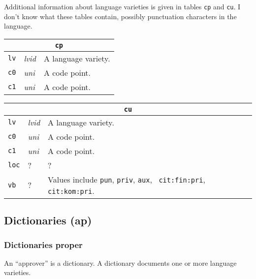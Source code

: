 Additional information about language varieties is given in tables
{\tt cp} and {\tt cu}.  I don't know what these tables contain,
possibly punctuation characters in the language.

\begin{trivlist}\item
\begin{tabular}{|llp{3.5in}|}
\hline
\multicolumn{3}{|c|}{\tt cp}\\
\hline
{\tt lv} & {\it lvid} & A language variety.\\
{\tt c0} & {\it uni} & A code point.\\
{\tt c1} & {\it uni} & A code point.\\
\hline
\end{tabular}
\end{trivlist}

\begin{trivlist}\item
\begin{tabular}{|llp{3.5in}|}
\hline
\multicolumn{3}{|c|}{\tt cu}\\
\hline
{\tt lv} & {\it lvid} & A language variety.\\
{\tt c0} & {\it uni} & A code point.\\
{\tt c1} & {\it uni} & A code point.\\
{\tt loc} & ? & ?\\
{\tt vb} & ? & Values include {\tt pun}, {\tt priv}, {\tt aux}, {\tt
  cit:fin:pri}, {\tt cit:kom:pri}.\\
\hline
\end{tabular}
\end{trivlist}

\subsection{Dictionaries (ap)}

\subsubsection{Dictionaries proper}

An ``approver'' is a dictionary.  A
dictionary documents one or more language varieties.

